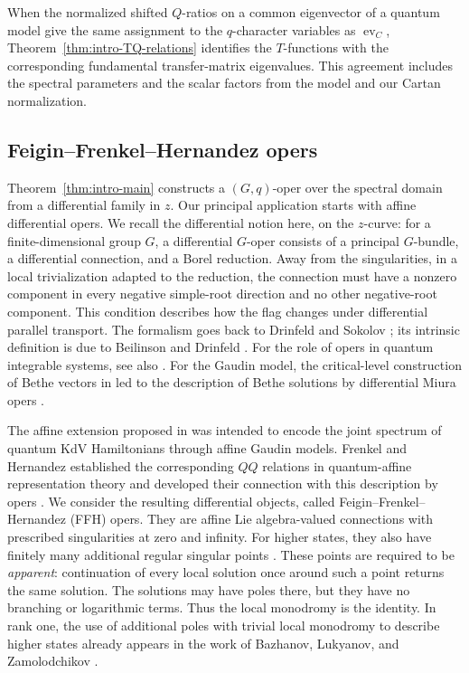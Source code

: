 \documentclass[11pt,leqno]{amsart}
\numberwithin{equation}{section}
\theoremstyle{plain}
\theoremstyle{definition}
\theoremstyle{plain}
\theoremstyle{definition}
\theoremstyle{remark}
\begin{document}
When the normalized shifted $Q$-ratios on a common eigenvector of a quantum model give the same assignment to the $q$-character variables as $\operatorname{ev}_C$, Theorem~\ref{thm:intro-TQ-relations} identifies the $T$-functions with the corresponding fundamental transfer-matrix eigenvalues.  This agreement includes the spectral parameters and the scalar factors from the model and our Cartan normalization.


\subsection{Feigin--Frenkel--Hernandez opers}\label{sec:intro-FFH-opers}

Theorem~\ref{thm:intro-main} constructs a $(G,q)$-oper over the spectral domain from a differential family in $z$.  Our principal application starts with affine differential opers.  We recall the differential notion here, on the $z$-curve: for a finite-dimensional group $G$, a differential $G$-oper consists of a principal $G$-bundle, a differential connection, and a Borel reduction.  Away from the singularities, in a local trivialization adapted to the reduction, the connection must have a nonzero component in every negative simple-root direction and no other negative-root component.  This condition describes how the flag changes under differential parallel transport.  The formalism goes back to Drinfeld and Sokolov \cite{DrinfeldSokolov1985}; its intrinsic definition is due to Beilinson and Drinfeld \cite{BeilinsonDrinfeld2005}. For the role of opers in quantum integrable systems, see also \cite{FrenkelGaudin2005}. For the Gaudin model, the critical-level construction of Bethe vectors in \cite{FeiginFrenkelReshetikhin1994} led to the description of Bethe solutions by differential Miura opers \cite{Frenkel2004}.

The affine extension proposed in \cite{FeiginFrenkel2011} was intended to encode the joint spectrum of quantum KdV Hamiltonians through affine Gaudin models.  Frenkel and Hernandez established the corresponding $QQ$ relations in quantum-affine representation theory and developed their connection with this description by opers \cite{FrenkelHernandez2018}.  We consider the resulting differential objects, called Feigin--Frenkel--Hernandez (FFH) opers.  They are affine Lie algebra-valued connections with prescribed singularities at zero and infinity.  For higher states, they also have finitely many additional regular singular points \cite{MRhigher2020,MR2024}.  These points are required to be \emph{apparent}: continuation of every local solution once around such a point returns the same solution.  The solutions may have poles there, but they have no branching or logarithmic terms.  Thus the local monodromy is the identity.  In rank one, the use of additional poles with trivial local monodromy to describe higher states already appears in the work of Bazhanov, Lukyanov, and Zamolodchikov \cite{BLZhigher2003}.
\end{document}
